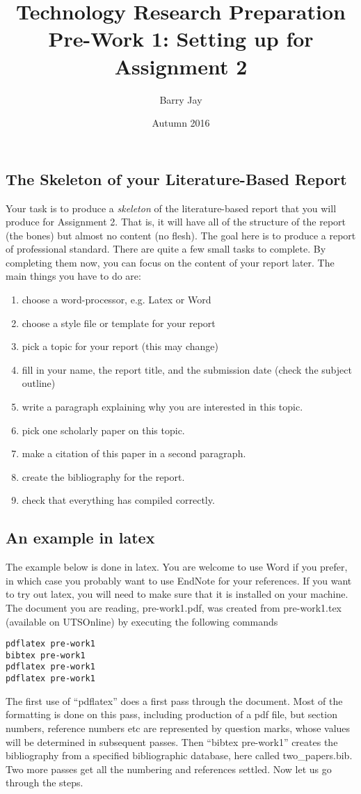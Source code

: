 \documentclass{article}
\title{Technology Research Preparation \\
Pre-Work 1: Setting up for Assignment 2 }
\author{Barry Jay}
\date{Autumn 2016}
\begin{document}
\maketitle

\subsection*{The Skeleton of your Literature-Based Report}

Your task is to produce a {\em skeleton} of the literature-based
report that you will produce for Assignment 2. That is, it will have
all of the structure of the report (the bones) but almost no content
(no flesh).  The goal here is to produce a report of professional
standard.  There are quite a few small tasks to complete. By
completing them now, you can focus on the content of your report
later.  The main things you have to do are:
\begin{enumerate}
\item choose a word-processor, e.g. Latex or Word
\item
choose a style file or template for your report
\item pick a topic for your report (this may change)
\item
fill in your name, the report title, and the submission date (check the subject outline)
\item
write a paragraph explaining why you are interested in this topic. 
\item
pick one scholarly paper on this topic. 
\item
make a citation of this paper in a second paragraph.
\item create the bibliography for the report.
\item 
check that everything has compiled correctly. 
\end{enumerate}


\subsection*{An example in latex}

The example below is done in latex. You are welcome to use Word if you
prefer, in which case you probably want to use EndNote for your references. 
If you want to try out latex, you will need to make sure that it is installed on your machine. 
The document you are reading, pre-work1.pdf, was created from
pre-work1.tex (available on UTSOnline) by executing the following commands
\begin{verbatim}
pdflatex pre-work1
bibtex pre-work1
pdflatex pre-work1
pdflatex pre-work1
\end{verbatim}
The first use of ``pdflatex'' does a first pass through the document.
Most of the formatting is done on this pass, including production of a
pdf file, but section numbers, reference numbers etc are represented
by question marks, whose values will be determined in subsequent
passes. Then ``bibtex pre-work1'' creates the bibliography from a
specified bibliographic database, here called two\_papers.bib. Two more passes get all the
numbering and references settled.
Now let us go through the steps.
\end{document}
